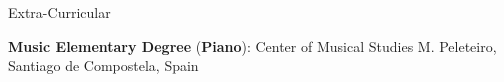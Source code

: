 \documentclass{resume} %
\begin{document}

\begin{mainSection}{Extra-Curricular} \itemsep -14pt
\item\textbf{ Music Elementary Degree} (\textbf{Piano}): Center of Musical Studies M. Peleteiro, Santiago de Compostela, Spain
\end{mainSection}
\end{document}
